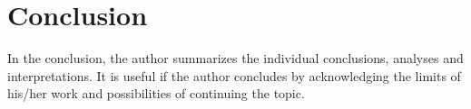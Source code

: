 \chapter*{Conclusion}

In the conclusion, the author summarizes the individual conclusions, analyses 
and interpretations. It is useful if the author concludes by acknowledging the 
limits of his/her work and possibilities of continuing the topic.